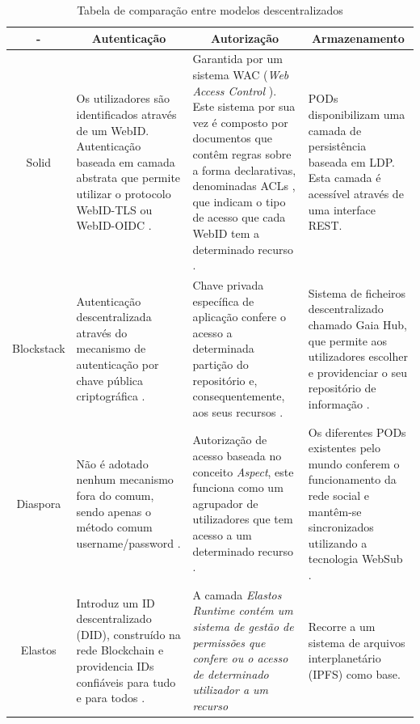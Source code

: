 \begin{center}
\small
\begin{longtable}{c|p{4cm}|p{4cm}|p{4cm}}
\caption{Tabela de comparação entre modelos descentralizados}
\label{tabela_comparacao_modelos_descentralizados}
\\
\toprule 
    \multicolumn{1}{c}{-} &
    \multicolumn{1}{c}{Autenticação} &
    \multicolumn{1}{c}{Autorização} &
    \multicolumn{1}{c}{Armazenamento}
    \\ \midrule\addlinespace[2pt] \endhead
\bottomrule\endfoot
\endlastfoot

Solid & Os utilizadores são identificados através de um WebID. Autenticação baseada em camada abstrata que permite utilizar o protocolo WebID-TLS ou WebID-OIDC \cite{solid_spec}. &  Garantida por um sistema WAC (\emph{Web Access Control} \label{sym:WAC}). Este sistema por sua vez é composto por documentos que contêm regras sobre a forma declarativas, denominadas ACLs \label{sym:ACL}, que indicam o tipo de acesso que cada WebID tem a determinado recurso \cite{solid_web_access_control}. & PODs disponibilizam uma camada de persistência baseada em LDP. Esta camada é acessível através de uma interface REST. \cite{solid_spec} \\
Blockstack & Autenticação descentralizada através do mecanismo de autenticação por chave pública criptográfica \cite{blockstack_white_paper}. & Chave privada específica de aplicação confere o acesso a determinada partição do repositório e, consequentemente, aos seus recursos \cite{blockstack_white_paper}. & Sistema de ficheiros descentralizado chamado Gaia Hub, que permite aos utilizadores escolher e providenciar o seu repositório de informação \cite{blockstack_white_paper}. \\
Diaspora & Não é adotado nenhum mecanismo fora do comum, sendo apenas o método comum username/password \cite{diaspora_wiki}. & Autorização de acesso baseada no conceito \emph{Aspect}, este funciona como um agrupador de utilizadores que tem acesso a um determinado recurso \cite{diaspora_wiki}. & Os diferentes PODs existentes pelo mundo conferem o funcionamento da rede social e mantêm-se sincronizados utilizando a tecnologia WebSub \cite{diaspora_wiki}. \\
Elastos & Introduz um ID descentralizado (DID), construído na rede Blockchain e providencia IDs confiáveis para tudo e para todos \cite{elastos_white_paper}. & A camada \emph{Elastos Runtime contém um sistema de gestão de permissões que confere ou o acesso de determinado utilizador a um recurso} \cite{elastos_white_paper} & Recorre a um sistema de arquivos interplanetário (IPFS) como base. \cite{elastos_developer}
\end{longtable}
\end{center}

